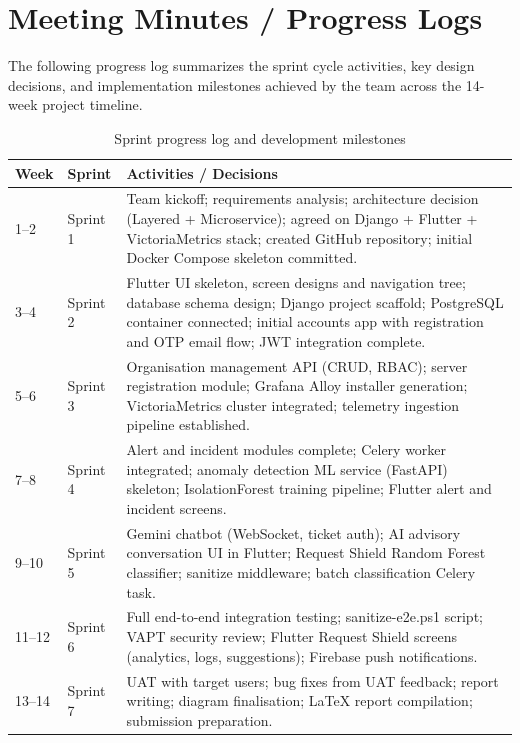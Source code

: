 \chapter{Meeting Minutes / Progress Logs}

The following progress log summarizes the sprint cycle activities, key design decisions, and implementation milestones achieved by the team across the 14-week project timeline.

\begin{table}[H]
\centering
\caption{Sprint progress log and development milestones}\label{tab:meetings}
\begin{tabularx}{\textwidth}{@{}l l X@{}}
\toprule
\textbf{Week} & \textbf{Sprint} & \textbf{Activities / Decisions}\\
\midrule
1--2  & Sprint 1 &
  Team kickoff; requirements analysis; architecture decision (Layered + Microservice);
  agreed on Django + Flutter + VictoriaMetrics stack; created GitHub repository;
  initial Docker Compose skeleton committed.\\
3--4  & Sprint 2 &
  Flutter UI skeleton, screen designs and navigation tree; database schema design;
  Django project scaffold; PostgreSQL container connected; initial accounts app
  with registration and OTP email flow; JWT integration complete.\\
5--6  & Sprint 3 &
  Organisation management API (CRUD, RBAC); server registration module;
  Grafana Alloy installer generation; VictoriaMetrics cluster integrated;
  telemetry ingestion pipeline established.\\
7--8  & Sprint 4 &
  Alert and incident modules complete; Celery worker integrated;
  anomaly detection ML service (FastAPI) skeleton; IsolationForest training
  pipeline; Flutter alert and incident screens.\\
9--10 & Sprint 5 &
  Gemini chatbot (WebSocket, ticket auth); AI advisory conversation
  UI in Flutter; Request Shield Random Forest classifier; sanitize middleware;
  batch classification Celery task.\\
11--12 & Sprint 6 &
  Full end-to-end integration testing; sanitize-e2e.ps1 script;
  VAPT security review; Flutter Request Shield screens (analytics, logs,
  suggestions); Firebase push notifications.\\
13--14 & Sprint 7 &
  UAT with target users; bug fixes from UAT feedback; report writing;
  diagram finalisation; LaTeX report compilation; submission preparation.\\
\bottomrule
\end{tabularx}
\end{table}

